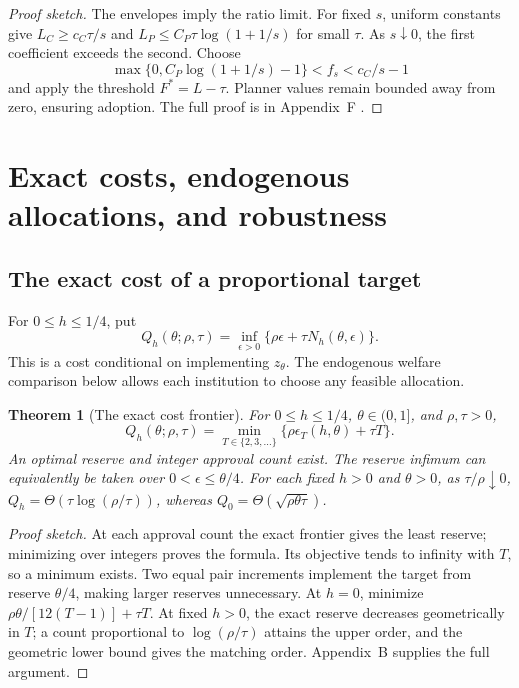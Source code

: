 \documentclass[ecta,draft]{econsocart}
\newtheorem{theorem}{Theorem}
\theoremstyle{definition}
\theoremstyle{definition}
\begin{document}
\begin{proof}[Proof sketch]
The envelopes imply the ratio limit. For fixed $s$, uniform constants
give $L_C\geq c_C\tau/s$ and
$L_P\leq C_P\tau\log(1+1/s)$ for small $\tau$.
As $s\downarrow0$, the first coefficient exceeds the second.
Choose
\[
 \max\{0,C_P\log(1+1/s)-1\}<f_s<c_C/s-1
\]
and apply the threshold $F^*=L-\tau$. Planner values remain bounded
away from zero, ensuring adoption. The full proof is in
Appendix~F%
.
\end{proof}


\section{Exact costs, endogenous allocations, and robustness}
\label{sec:optimalreserve}
\subsection{The exact cost of a proportional target}
\label{sec:productivecost}

For $0\leq h\leq1/4$, put
\[
 Q_h(\theta;\rho,\tau)
 =\inf_{\epsilon>0}\{\rho\epsilon+\tau N_h(\theta,\epsilon)\}.
\]
This is a cost conditional on implementing $z_\theta$. The endogenous welfare
comparison below allows each institution to choose any feasible allocation.

\begin{theorem}[The exact cost frontier]
\label{thm:productivecost}
For $0\leq h\leq1/4$, $\theta\in(0,1]$, and $\rho,\tau>0$,
\begin{equation}
 Q_h(\theta;\rho,\tau)=\min_{T\in\{2,3,\ldots\}}
    \{\rho\epsilon_T(h,\theta)+\tau T\}.
 \label{eq:productivecostexact}
\end{equation}
An optimal reserve and integer approval count exist. The reserve infimum can
equivalently be taken over $0<\epsilon\leq\theta/4$.
For each fixed $h>0$ and $\theta>0$, as $\tau/\rho\downarrow0$,
$Q_h=\Theta(\tau\log(\rho/\tau))$, whereas
$Q_0=\Theta(\sqrt{\rho\theta\tau})$.
\end{theorem}
\begin{proof}[Proof sketch]
At each approval count the exact frontier gives the least reserve; minimizing
over integers proves the formula. Its objective tends to infinity with $T$,
so a minimum exists. Two equal pair increments implement the target from
reserve $\theta/4$, making larger reserves unnecessary. At $h=0$, minimize
$\rho\theta/[12(T-1)]+\tau T$. At fixed $h>0$, the exact reserve decreases
geometrically in $T$; a count proportional to $\log(\rho/\tau)$ attains
the upper order, and the geometric lower bound gives the matching order.
Appendix~B%
 supplies the full argument.
\end{proof}
\end{document}
